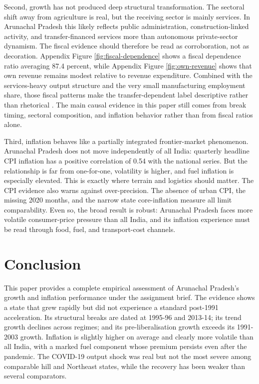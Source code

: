 \documentclass[11pt,a4paper]{article}
\begin{document}
Second, growth has not produced deep structural transformation. The sectoral shift away from agriculture is real, but the receiving sector is mainly services. In Arunachal Pradesh this likely reflects public administration, construction-linked activity, and transfer-financed services more than autonomous private-sector dynamism. The fiscal evidence should therefore be read as corroboration, not as decoration. Appendix Figure \ref{fig:fiscal-dependence} shows a fiscal dependence ratio averaging 87.4 percent, while Appendix Figure \ref{fig:own-revenue} shows that own revenue remains modest relative to revenue expenditure. Combined with the services-heavy output structure and the very small manufacturing employment share, those fiscal patterns make the transfer-dependent label descriptive rather than rhetorical \citep{govil_chauhan_2024,niti_ncaer_2025_arunachal}. The main causal evidence in this paper still comes from break timing, sectoral composition, and inflation behavior rather than from fiscal ratios alone.

Third, inflation behaves like a partially integrated frontier-market phenomenon. Arunachal Pradesh does not move independently of all India: quarterly headline CPI inflation has a positive correlation of 0.54 with the national series. But the relationship is far from one-for-one, volatility is higher, and fuel inflation is especially elevated. This is exactly where terrain and logistics should matter. The CPI evidence also warns against over-precision. The absence of urban CPI, the missing 2020 months, and the narrow state core-inflation measure all limit comparability. Even so, the broad result is robust: Arunachal Pradesh faces more volatile consumer-price pressure than all India, and its inflation experience must be read through food, fuel, and transport-cost channels.

\section{Conclusion}

This paper provides a complete empirical assessment of Arunachal Pradesh's growth and inflation performance under the assignment brief. The evidence shows a state that grew rapidly but did not experience a standard post-1991 acceleration. Its structural breaks are dated at 1995-96 and 2013-14; its trend growth declines across regimes; and its pre-liberalisation growth exceeds its 1991-2003 growth. Inflation is slightly higher on average and clearly more volatile than all India, with a marked fuel component whose premium persists even after the pandemic. The COVID-19 output shock was real but not the most severe among comparable hill and Northeast states, while the recovery has been weaker than several comparators.
\end{document}
